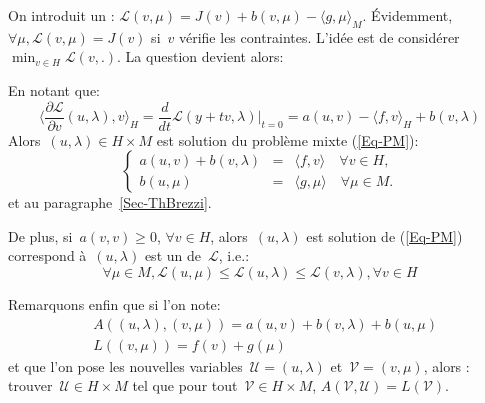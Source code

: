 \medskip



On introduit un :
$\mathscr{L}(v,\mu) = J(v)+b(v,\mu) - \langle g,\mu\rangle_M$.
Évidemment, $\forall\mu, \mathscr{L}(v,\mu)=J(v)$ si~$v$ vérifie les contraintes.
L'idée est de considérer~$\min_{v\in H} \mathscr{L}(v,.)$.
La question devient alors: 


\medskip



En notant que:
\begin{equation}\langle\frac{\partial\mathscr{L}}{\partial v}(u,\lambda),v\rangle_H
=\frac d{dt}\mathscr{L}(y+tv,\lambda)|_{t=0}
=a(u,v)-\langle f,v\rangle_H+b(v,\lambda)
\end{equation}
Alors~$(u,\lambda) \in H\times M$ est solution du problème mixte (\ref{Eq-PM}):
 \begin{equation}\left\{
\begin{array}{rcl}
 a(u,v) + b(v, \lambda) &=& \langle f,v\rangle \quad \forall v\in H,\\
b(u,\mu) &=& \langle g,\mu\rangle \quad \forall \mu \in M.
\end{array}\right.
\end{equation}
et  au paragraphe~\ref{Sec-ThBrezzi}.

\medskip
De plus, si~$a(v,v)\ge 0$, $\forall v\in H$, alors~$(u,\lambda)$ est solution de (\ref{Eq-PM}) correspond à~$(u,\lambda)$ est un  de~$\mathscr{L}$, i.e.:
\begin{equation}
\forall\mu\in M, \mathscr{L}(u,\mu) \le \mathscr{L}(u,\lambda) \le
\mathscr{L}(v,\lambda), \forall v\in H
\end{equation}


\medskip
Remarquons enfin que si l'on note:
\begin{align}&A((u,\lambda),(v,\mu))=a(u,v)+b(v,\lambda)+b(u,\mu)\\
&L((v,\mu))=f(v)+g(\mu)\end{align}
et que l'on pose les nouvelles variables~$\mathscr{U}=(u,\lambda)$ et~$\mathscr{V}=(v,\mu)$, alors : trouver~$\mathscr{U}\in H\times M$
tel que pour tout~$\mathscr{V}\in H\times M$, $A(\mathscr{V},\mathscr{U})=L(\mathscr{V})$.

